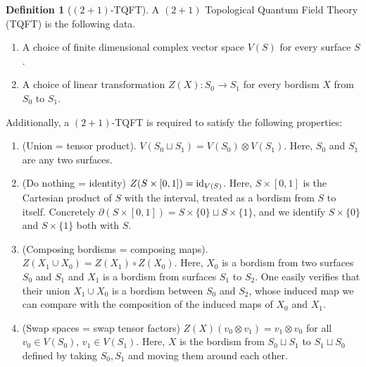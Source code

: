 \documentclass{article}
\theoremstyle{definition}
\newtheorem*{definition}{Definition}
\numberwithin{figure}{section}
\begin{document}
\begin{definition}[$(2+1)$-TQFT] A $(2+1)$ Topological Quantum Field Theory (TQFT) is the following data.
\begin{enumerate}
\item A choice of finite dimensional complex vector space $V(S)$ for every surface $S$.
\item A choice of linear transformation $Z(X): S_0\xrightarrow{} S_1$ for every bordism $X$ from $S_0$ to $S_1$.
\end{enumerate}
Additionally, a $(2+1)$-TQFT is required to satisfy the following properties:
\begin{enumerate}

\item (Union = tensor product). $V(S_0\sqcup S_1)=V(S_0)\otimes V(S_1)$. Here, $S_0$ and $S_1$ are any two surfaces.

\item (Do nothing = identity) $Z(S\times [0,1])=\mathrm{id}_{V(S)}$. Here, $S\times [0,1]$ is the Cartesian product of $S$ with the interval, treated as a bordism from $S$ to itself. Concretely $\partial (S\times [0,1])=S\times\{0\}\sqcup S\times\{1\}$, and we identify $S\times \{0\}$ and $S\times\{1\}$ both with $S$.

\item (Composing bordisms = composing maps). $Z(X_1\cup X_0)=Z(X_1)\circ Z(X_0)$. Here, $X_0$ is a bordism from two surfaces $S_0$ and $S_1$ and $X_1$ is a bordism from surfaces $S_1$ to $S_2$. One easily verifies that their union $X_1\cup X_0$ is a bordism between $S_0$ and $S_2$, whose induced map we can compare with the composition of the induced maps of $X_0$ and $X_1$.

\item (Swap spaces = swap tensor factors) $Z(X)(v_0\otimes v_1)=v_1\otimes v_0$ for all $v_0\in V(S_0)$, $v_1\in V(S_1)$. Here, $X$ is the bordism from $S_0\sqcup S_1$ to $S_1\sqcup S_0$ defined by taking $S_0,S_1$ and moving them around each other. 
\end{enumerate}

\raggedleft\qedsymbol{}

\end{definition}
\end{document}
